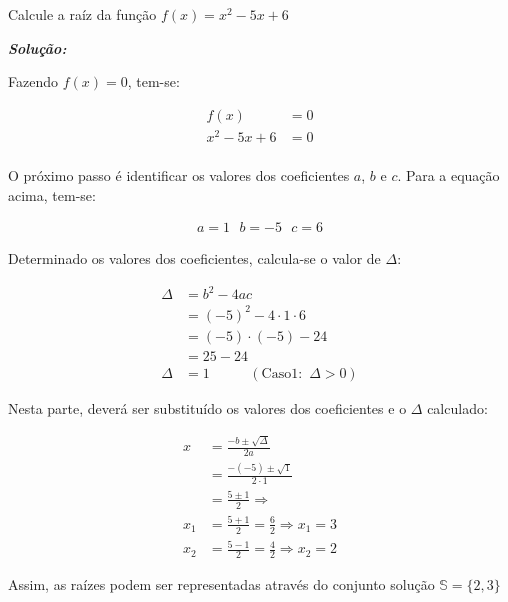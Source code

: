 \begin{example}\label{caso1}
	Calcule a raíz da função $f(x)=x^2-5x+6$
	
	\textit{\textbf{Solução:}}
	
	Fazendo $f(x)=0$, tem-se:
	\begin{ceqn}
		\begin{align*}
		f(x)&=0 \\
		x^2-5x+6&=0 \\
		\end{align*}
	\end{ceqn}
	
	O próximo passo é identificar os valores dos coeficientes $a$, $b$ e $c$. Para a equação acima, tem-se:
	
	\begin{ceqn}
		\begin{align*}
		a=1 \,\,\,\, b=-5 \,\,\,\, c=6
		\end{align*}
	\end{ceqn}

Determinado os valores dos coeficientes, calcula-se o valor de $\Delta$:
	
	\begin{ceqn}
		\begin{align*}
		\Delta &= b^2-4ac \\
		&=(-5)^2-4 \cdot 1 \cdot 6 \\
		&= (-5)\cdot (-5)-24 \\
		&= 25 - 24 \\
		\Delta &=1 \,\,\,\,\,\,\,\,\,\,\,\,\,\,\,\,\, (\mathrm{Caso 1:}\,\, \Delta>0)
		\end{align*}
	\end{ceqn}
	
	Nesta parte, deverá ser substituído os valores dos coeficientes e o $\Delta$ calculado:
	
	\begin{ceqn}
		\begin{align*}
		x &= \frac{-b\pm \sqrt{\Delta}}{2a} \\
		&= \frac{-(-5)\pm\sqrt{1}}{2\cdot 1} \\
		&= \frac{5 \pm 1}{2} \Rightarrow \\
		x_1 &= \frac{5+1}{2}=\frac{6}{2} \Rightarrow x_1 = 3 \\
		x_2 &= \frac{5-1}{2}=\frac{4}{2} \Rightarrow x_2 = 2 
		\end{align*}
	\end{ceqn}

Assim, as raízes podem ser representadas através do conjunto solução $\mathbb{S}=\{2,3\}$

\end{example}

